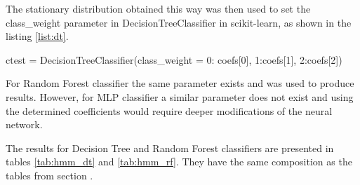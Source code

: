 The stationary distribution obtained this way was then used to set the class\_weight parameter in DecisionTreeClassifier in scikit-learn, as shown in the listing \ref{list:dt}.

\begin{python}[caption = {Definition of the Decision Tree Classifier taking into consideration the stationary distribution}, label = list:dt]
ctest = DecisionTreeClassifier(class_weight = {0: coefs[0], 1:coefs[1], 2:coefs[2]})  
\end{python}

For Random Forest classifier the same parameter exists and was used to produce results. However, for MLP classifier a similar parameter does not exist and using the determined coefficients would require deeper modifications of the neural network.

The results for Decision Tree and Random Forest classifiers are presented in tables \ref{tab:hmm_dt} and \ref{tab:hmm_rf}. They have the same composition as the tables from section \label{sec:metrics}.

